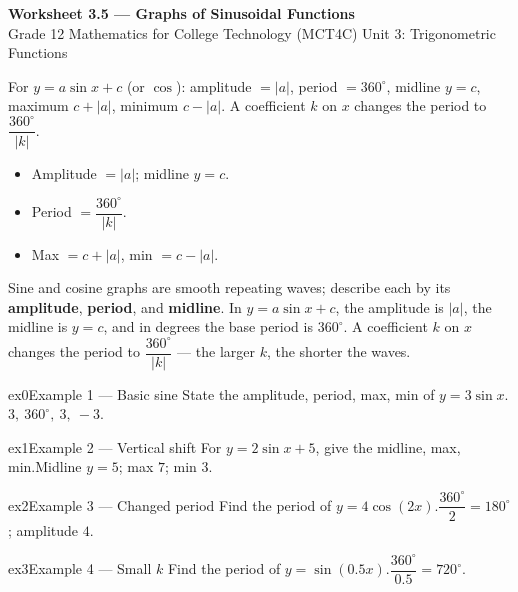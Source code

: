 \documentclass[11pt]{article}
\begin{document}
\begin{center}
{\LARGE\bfseries\color{titleblue}Worksheet 3.5 --- Graphs of Sinusoidal Functions}\\[2pt]
{\small Grade 12 Mathematics for College Technology (MCT4C) \textperiodcentered{} Unit 3: Trigonometric Functions}
\end{center}

\begin{ideabox}
For $y=a\sin x+c$ (or $\cos$): amplitude $=|a|$, period $=360^\circ$, midline $y=c$, maximum $c+|a|$, minimum $c-|a|$. A coefficient $k$ on $x$ changes the period to $\dfrac{360^\circ}{|k|}$.
\begin{itemize}[leftmargin=*,itemsep=2pt]
  \item Amplitude $=|a|$; midline $y=c$.
  \item Period $=\dfrac{360^\circ}{|k|}$.
  \item Max $=c+|a|$, min $=c-|a|$.
\end{itemize}
\end{ideabox}

\begin{learnbox}
Sine and cosine graphs are smooth repeating waves; describe each by its \textbf{amplitude}, \textbf{period}, and \textbf{midline}.
In $y=a\sin x+c$, the amplitude is $|a|$, the midline is $y=c$, and in degrees the base period is $360^\circ$.
A coefficient $k$ on $x$ changes the period to $\dfrac{360^\circ}{|k|}$ — the larger $k$, the shorter the waves.
\end{learnbox}


\begin{example}{ex0}{Example 1 --- Basic sine}
State the amplitude, period, max, min of $y=3\sin x$.\soln $3,\ 360^\circ,\ 3,\ -3$.
\end{example}

\begin{example}{ex1}{Example 2 --- Vertical shift}
For $y=2\sin x+5$, give the midline, max, min.\soln Midline $y=5$; max $7$; min $3$.
\end{example}

\begin{example}{ex2}{Example 3 --- Changed period}
Find the period of $y=4\cos(2x)$.\soln $\dfrac{360^\circ}{2}=180^\circ$; amplitude $4$.
\end{example}

\begin{example}{ex3}{Example 4 --- Small $k$}
Find the period of $y=\sin(0.5x)$.\soln $\dfrac{360^\circ}{0.5}=720^\circ$.
\end{example}
\end{document}
